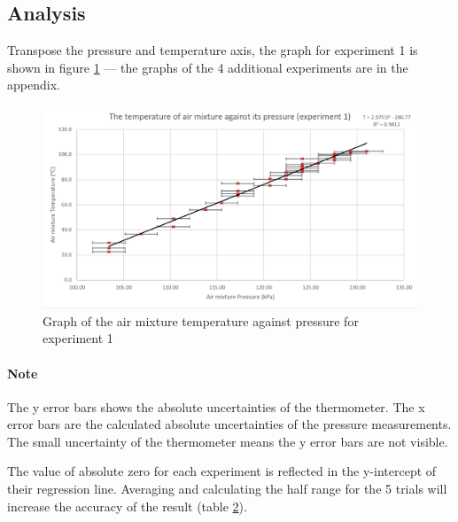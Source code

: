 \documentclass[a4paper,12pt]{article}
\begin{document}
\subsection{Analysis}

Transpose the pressure and temperature axis, the graph for experiment 1 is shown in figure \ref{fig:t1} --- the graphs of the 4 additional experiments are in the appendix.

\begin{figure}[H]
    \centering
    \includegraphics[width=\textwidth]{assets/graph1.png}
    \caption{Graph of the air mixture temperature against pressure for experiment 1}
    \label{fig:t1}
\end{figure}

\paragraph{Note} The y error bars shows the absolute uncertainties of the thermometer. The x error bars are the calculated absolute uncertainties of the pressure measurements. The small uncertainty of the thermometer means the y error bars are not visible.

The value of absolute zero for each experiment is reflected in the y-intercept of their regression line. Averaging and calculating the half range for the 5 trials will increase the accuracy of the result (table \ref{fig:yi}).

\begin{figure}[H]
    \centering
    \label{fig:yi}
\end{figure}
\end{document}
